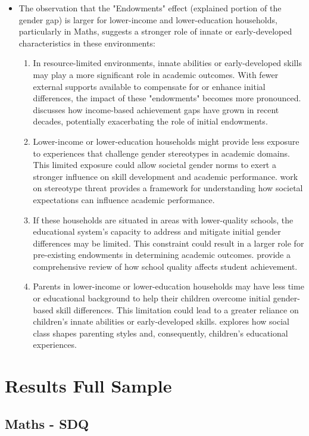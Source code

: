 \documentclass[12pt,a4paper,onecolumn]{article}
\numberwithin{equation}{section}
\begin{document}
\begin{itemize}
\item The observation that the "Endowments" effect (explained portion of the gender gap) is larger for lower-income and lower-education households, particularly in Maths, suggests a stronger role of innate or early-developed characteristics in these environments:
\begin{enumerate}
    \item In resource-limited environments, innate abilities or early-developed skills may play a more significant role in academic outcomes. With fewer external supports available to compensate for or enhance initial differences, the impact of these "endowments" becomes more pronounced. \textcite{reardon2011whither} discusses how income-based achievement gaps have grown in recent decades, potentially exacerbating the role of initial endowments.
    \item Lower-income or lower-education households might provide less exposure to experiences that challenge gender stereotypes in academic domains. This limited exposure could allow societal gender norms to exert a stronger influence on skill development and academic performance. \textcite{spencer1999stereotype} work on stereotype threat provides a framework for understanding how societal expectations can influence academic performance.
    \item If these households are situated in areas with lower-quality schools, the educational system's capacity to address and mitigate initial gender differences may be limited. This constraint could result in a larger role for pre-existing endowments in determining academic outcomes. \textcite{hanushek2014school} provide a comprehensive review of how school quality affects student achievement.
    \item Parents in lower-income or lower-education households may have less time or educational background to help their children overcome initial gender-based skill differences. This limitation could lead to a greater reliance on children's innate abilities or early-developed skills. \textcite{lareau2011unequal} explores how social class shapes parenting styles and, consequently, children's educational experiences.
\end{enumerate}
\end{itemize}


\section{Results Full Sample}
\subsection{Maths - SDQ}
\end{document}
